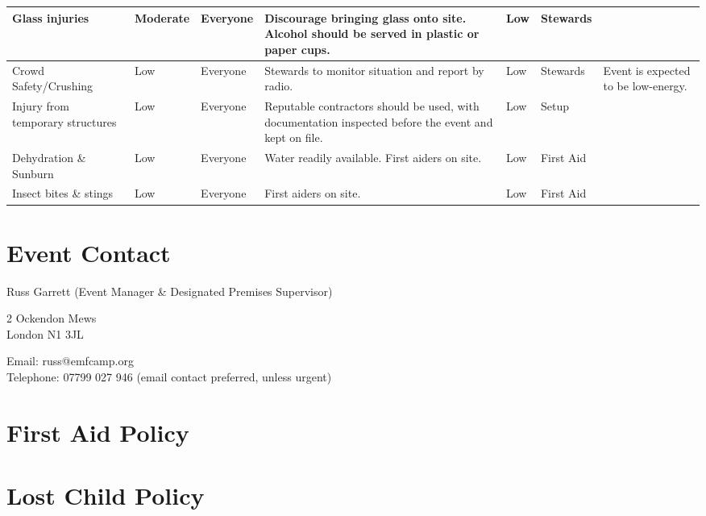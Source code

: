 \begin{landscape}
\begin{tabular}{| p{3cm} | l | p{1.5cm} | p{9cm} | p{1.5cm} | p{2cm} | p{6cm} |}
Glass injuries & Moderate & Everyone &
Discourage bringing glass onto site. Alcohol should be served in plastic or paper cups. &
Low & Stewards & \\ \hline

Crowd Safety/Crushing & Low & Everyone &
Stewards to monitor situation and report by radio. &
Low & Stewards & Event is expected to be low-energy. \\ \hline

Injury from temporary structures & Low & Everyone &
Reputable contractors should be used, with documentation inspected before the event and kept on file. &
Low & Setup & \\ \hline

Dehydration \& Sunburn & Low & Everyone &
Water readily available. First aiders on site. & Low & First Aid & \\ \hline

Insect bites \& stings & Low & Everyone &
First aiders on site. & Low & First Aid & \\ \hline

\end{tabular}

\end{landscape}
\restoregeometry


\section{Event Contact}

Russ Garrett (Event Manager \& Designated Premises Supervisor)

2 Ockendon Mews \\
London N1 3JL

Email: russ@emfcamp.org \\
Telephone: 07799 027 946 (email contact preferred, unless urgent)

\newpage
\appendix

\section{First Aid Policy}
\label{first-aid-policy}

\newpage

\section{Lost Child Policy}
\label{lost-child-policy}


